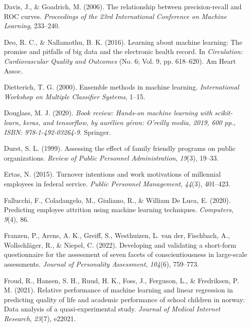 \documentclass[
  jou]{apa6}
\newlength{\cslhangindent}
\newlength{\cslentryspacingunit} %
\newenvironment{CSLReferences}[2] %
 {%
  \setlength{\parindent}{0pt}
  \ifodd #1
  \let\oldpar\par
  \def\par{\hangindent=\cslhangindent\oldpar}
  \fi
  \setlength{\parskip}{#2\cslentryspacingunit}
 }%
 {}
\begin{document}
\begin{CSLReferences}{1}{0}
\leavevmode{}%
Davis, J., \& Goadrich, M. (2006). The relationship between precision-recall and ROC curves. \emph{Proceedings of the 23rd International Conference on Machine Learning}, 233--240.

\leavevmode{}%
Deo, R. C., \& Nallamothu, B. K. (2016). Learning about machine learning: The promise and pitfalls of big data and the electronic health record. In \emph{Circulation: Cardiovascular Quality and Outcomes} (No. 6; Vol. 9, pp. 618--620). Am Heart Assoc.

\leavevmode{}%
Dietterich, T. G. (2000). Ensemble methods in machine learning. \emph{International Workshop on Multiple Classifier Systems}, 1--15.

\leavevmode{}%
Douglass, M. J. (2020). \emph{Book review: Hands-on machine learning with scikit-learn, keras, and tensorflow, by aur{é}lien g{é}ron: O'reilly media, 2019, 600 pp., ISBN: 978-1-492-03264-9}. Springer.

\leavevmode{}%
Durst, S. L. (1999). Assessing the effect of family friendly programs on public organizations. \emph{Review of Public Personnel Administration}, \emph{19}(3), 19--33.

\leavevmode{}%
Ertas, N. (2015). Turnover intentions and work motivations of millennial employees in federal service. \emph{Public Personnel Management}, \emph{44}(3), 401--423.

\leavevmode{}%
Fallucchi, F., Coladangelo, M., Giuliano, R., \& William De Luca, E. (2020). Predicting employee attrition using machine learning techniques. \emph{Computers}, \emph{9}(4), 86.

\leavevmode{}%
Franzen, P., Arens, A. K., Greiff, S., Westhuizen, L. van der, Fischbach, A., Wollschläger, R., \& Niepel, C. (2022). Developing and validating a short-form questionnaire for the assessment of seven facets of conscientiousness in large-scale assessments. \emph{Journal of Personality Assessment}, \emph{104}(6), 759--773.

\leavevmode{}%
Froud, R., Hansen, S. H., Ruud, H. K., Foss, J., Ferguson, L., \& Fredriksen, P. M. (2021). Relative performance of machine learning and linear regression in predicting quality of life and academic performance of school children in norway: Data analysis of a quasi-experimental study. \emph{Journal of Medical Internet Research}, \emph{23}(7), e22021.


\end{CSLReferences}
\end{document}
